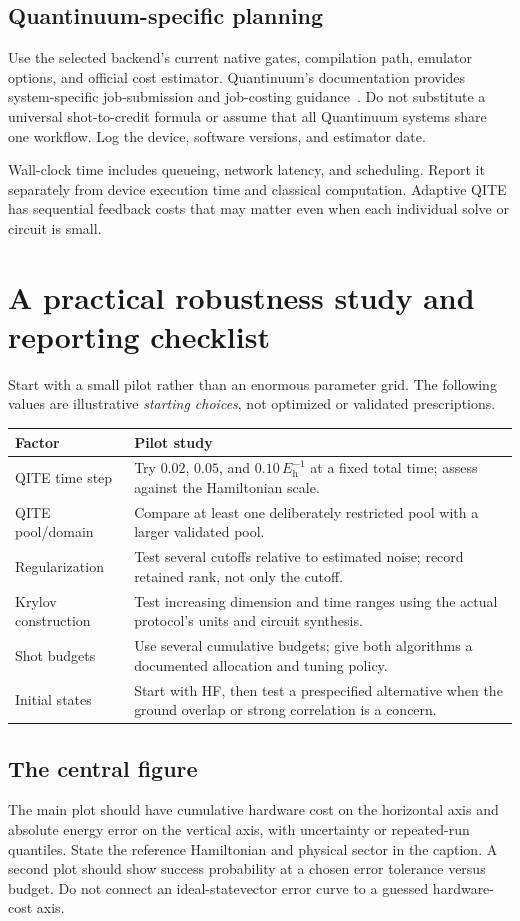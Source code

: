 \documentclass[11pt,a4paper]{article}
\newcommand{\Eh}{E_{\mathrm h}}
\newcommand{\lesson}[2]{\clearpage\section{#1}\label{#2}}
\begin{document}
\subsection*{Quantinuum-specific planning}
Use the selected backend's current native gates, compilation path, emulator options, and official cost estimator. Quantinuum's documentation provides system-specific job-submission and job-costing guidance~\cite{quantinuum,quantcost}. Do not substitute a universal shot-to-credit formula or assume that all Quantinuum systems share one workflow. Log the device, software versions, and estimator date.

\begin{caution}
Wall-clock time includes queueing, network latency, and scheduling. Report it separately from device execution time and classical computation. Adaptive QITE has sequential feedback costs that may matter even when each individual solve or circuit is small.
\end{caution}

\lesson{A practical robustness study and reporting checklist}{sec:robustness}
Start with a small pilot rather than an enormous parameter grid. The following values are illustrative \emph{starting choices}, not optimized or validated prescriptions.

\begin{tabularx}{\linewidth}{@{}p{3.1cm}X@{}}
\toprule
Factor & Pilot study\\\midrule
QITE time step & Try $0.02$, $0.05$, and $0.10\,\Eh^{-1}$ at a fixed total time; assess against the Hamiltonian scale.\\
QITE pool/domain & Compare at least one deliberately restricted pool with a larger validated pool.\\
Regularization & Test several cutoffs relative to estimated noise; record retained rank, not only the cutoff.\\
Krylov construction & Test increasing dimension and time ranges using the actual protocol's units and circuit synthesis.\\
Shot budgets & Use several cumulative budgets; give both algorithms a documented allocation and tuning policy.\\
Initial states & Start with HF, then test a prespecified alternative when the ground overlap or strong correlation is a concern.\\\bottomrule
\end{tabularx}

\subsection*{The central figure}
The main plot should have cumulative hardware cost on the horizontal axis and absolute energy error on the vertical axis, with uncertainty or repeated-run quantiles. State the reference Hamiltonian and physical sector in the caption. A second plot should show success probability at a chosen error tolerance versus budget. Do not connect an ideal-statevector error curve to a guessed hardware-cost axis.
\end{document}
